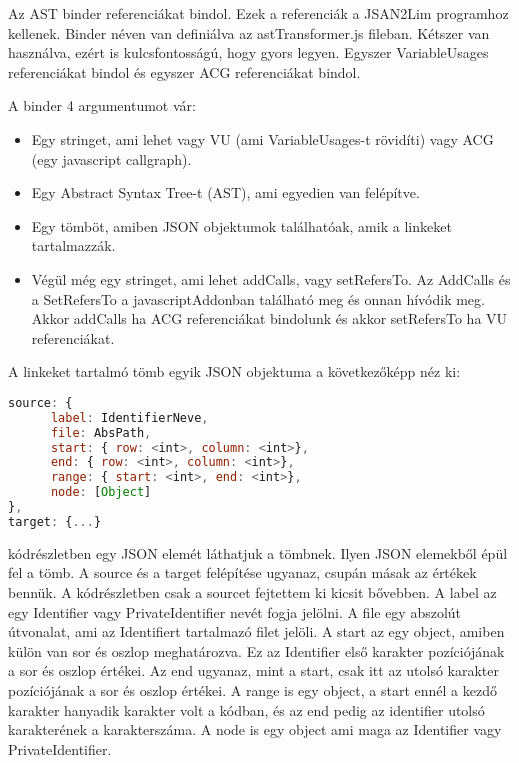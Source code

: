 Az AST binder referenciákat bindol. Ezek a referenciák a JSAN2Lim programhoz kellenek.
Binder néven van definiálva az astTransformer.js fileban.
Kétszer van használva, ezért is kulcsfontosságú, hogy gyors legyen.
Egyszer VariableUsages referenciákat bindol és egyszer ACG referenciákat bindol.

\noindent

A binder 4 argumentumot vár:

\begin{itemize}
      \item Egy stringet, ami lehet vagy VU (ami VariableUsages-t rövidíti) vagy ACG (egy javascript callgraph).
      \item Egy Abstract Syntax Tree-t (AST), ami egyedien van felépítve.
      \item Egy tömböt, amiben JSON objektumok találhatóak, amik a linkeket tartalmazzák.
      \item Végül még egy stringet, ami lehet addCalls, vagy setRefersTo. Az AddCalls és a SetRefersTo a javascriptAddonban található meg és onnan hívódik meg.
      Akkor addCalls ha ACG referenciákat bindolunk és akkor setRefersTo ha VU referenciákat.
\end{itemize}

A linkeket tartalmó tömb egyik JSON objektuma a következőképp néz ki:

\begin{lstlisting}[caption={Binder JSON argumentuma}, label={lst:binder_json_arg}, language={JavaScript}]
source: {
      label: IdentifierNeve,
      file: AbsPath,
      start: { row: <int>, column: <int>},
      end: { row: <int>, column: <int>},
      range: { start: <int>, end: <int>},
      node: [Object]
},
target: {...}
\end{lstlisting}

 kódrészletben egy JSON elemét láthatjuk a tömbnek. Ilyen JSON elemekből épül fel a tömb.
A source és a target felépítése ugyanaz, csupán másak az értékek bennük.
A kódrészletben csak a sourcet fejtettem ki kicsit bővebben. A label az egy Identifier vagy PrivateIdentifier nevét fogja jelölni.
A file egy abszolút útvonalat, ami az Identifiert tartalmazó filet jelöli.
A start az egy object, amiben külön van sor és oszlop meghatározva. Ez az Identifier első karakter pozíciójának a sor és oszlop értékei.
Az end ugyanaz, mint a start, csak itt az utolsó karakter pozíciójának a sor és oszlop értékei.
A range is egy object, a start ennél a kezdő karakter hanyadik karakter volt a kódban, és az end pedig az identifier utolsó karakterének a karakterszáma.
A node is egy object ami maga az Identifier vagy PrivateIdentifier.

